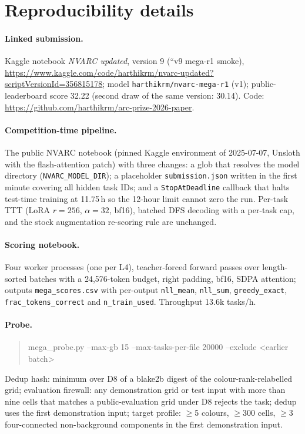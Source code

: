 \documentclass[11pt]{article}
\newcommand{\nvarc}{NVARC}
\begin{document}



\clearpage
\appendix
\section{Reproducibility details}
\label{app:repro}

\paragraph{Linked submission.}
Kaggle notebook \emph{NVARC updated}, version 9 (``v9 mega-r1 smoke), \url{https://www.kaggle.com/code/harthikrm/nvarc-updated?scriptVersionId=356815178}; model \texttt{harthikrm/nvarc-mega-r1} (v1); public-leaderboard score 32.22 (second draw of the same version: 30.14). Code: \url{https://github.com/harthikrm/arc-prize-2026-paper}.

\paragraph{Competition-time pipeline.}
The public \nvarc{} notebook (pinned Kaggle environment of 2025-07-07, Unsloth with the flash-attention patch) with three changes: a glob that resolves the model directory (\texttt{NVARC\_MODEL\_DIR}); a placeholder \texttt{submission.json} written in the first minute covering all hidden task IDs; and a \texttt{StopAtDeadline} callback that halts test-time training at 11.75\,h so the 12-hour limit cannot zero the run. Per-task TTT (LoRA $r{=}256$, $\alpha{=}32$, bf16), batched DFS decoding with a per-task cap, and the stock augmentation re-scoring rule are unchanged.

\paragraph{Scoring notebook.}
Four worker processes (one per L4), teacher-forced forward passes over length-sorted batches with a 24{,}576-token budget, right padding, bf16, SDPA attention; outputs \texttt{mega\_scores.csv} with per-output \texttt{nll\_mean}, \texttt{nll\_sum}, \texttt{greedy\_exact}, \texttt{frac\_tokens\_correct} and \texttt{n\_train\_used}. Throughput 13.6k tasks/h.

\paragraph{Probe.}
\begin{quote}\small\ttfamily mega\_probe.py --max-gb 15 --max-tasks-per-file 20000 --exclude <earlier batch>\end{quote}
Dedup hash: minimum over D8 of a blake2b digest of the colour-rank-relabelled grid; evaluation firewall: any demonstration grid or test input with more than nine cells that matches a public-evaluation grid under D8 rejects the task; dedup uses the first demonstration input; target profile: $\ge$5 colours, $\ge$300 cells, $\ge$3 four-connected non-background components in the first demonstration input.
\end{document}
